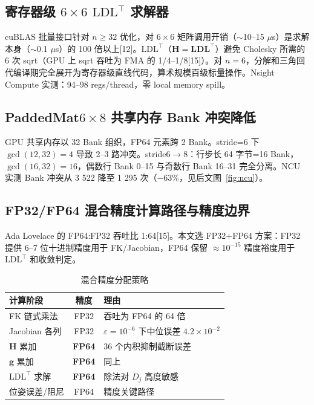 \documentclass[twocolumn,a4paper,10pt]{ctexart}
\begin{document}
\subsection{寄存器级 $6\times6$ $\mathrm{LDL}^\top$ 求解器}

cuBLAS 批量接口针对 $n\ge32$ 优化，对 $6\times6$ 矩阵调用开销（$\sim$10--15 $\mu$s）是求解本身（$\sim$0.1 $\mu$s）的 100 倍以上[12]。$\mathrm{LDL}^\top$（$\mathbf{H}=\mathbf{L}\mathbf{D}\mathbf{L}^\top$）避免 Cholesky 所需的 6 次 sqrt（GPU 上 sqrt 吞吐为 FMA 的 1/4--1/8[15]）。对 $n=6$，分解和三角回代编译期完全展开为寄存器级直线代码，算术规模百级标量操作。Nsight Compute 实测：94--98 regs/thread，零 local memory spill。

\subsection{PaddedMat$6\times8$ 共享内存 Bank 冲突降低}

GPU 共享内存以 32 Bank 组织，FP64 元素跨 2 Bank。stride=6 下 $\gcd(12,32)=4$ 导致 2--3 路冲突。stride$6\to8$：行步长 64 字节=16 Bank，$\gcd(16,32)=16$，偶数行 Bank 0--15 与奇数行 Bank 16--31 完全分离。NCU 实测 Bank 冲突从 3 522 降至 1 295 次（$-63\%$，见后文图~\ref{fig:ncu}）。

\subsection{FP32/FP64 混合精度计算路径与精度边界}

Ada Lovelace 的 FP64:FP32 吞吐比 1:64[15]。本文选 FP32+FP64 方案：FP32 提供 6--7 位十进制精度用于 FK/Jacobian，FP64 保留 $\approx10^{-15}$ 精度裕度用于 $\mathrm{LDL}^\top$ 和收敛判定。

\begin{table}[ht]
\centering\small
\caption{混合精度分配策略}
\label{tab:mixedprec}
\begin{tabular}{lcl}
\toprule
计算阶段 & 精度 & 理由 \\
\midrule
FK 链式乘法 & FP32 & 吞吐为 FP64 的 64 倍 \\
Jacobian 各列 & FP32 & $\varepsilon=10^{-6}$ 下中位误差 $4.2\times10^{-2}$ \\
$\mathbf{H}$ 累加 & {\bfseries FP64} & 36 个内积抑制截断误差 \\
$\mathbf{g}$ 累加 & {\bfseries FP64} & 同上 \\
$\mathrm{LDL}^\top$ 求解 & {\bfseries FP64} & 除法对 $D_j$ 高度敏感 \\
位姿误差/阻尼 & FP64 & 精度关键路径 \\
\bottomrule
\end{tabular}
\end{table}
\end{document}
